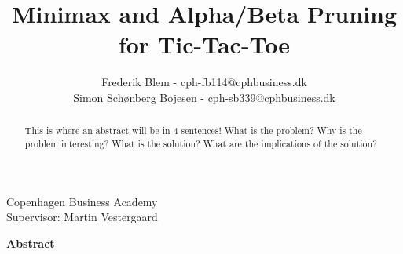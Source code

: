 \documentclass[
english, %
headsepline, %
]{scrartcl} %
\begin{document}
\begin{titlepage}
\title{Minimax and Alpha/Beta Pruning for Tic-Tac-Toe}
\author{Frederik Blem - cph-fb114@cphbusiness.dk\\
Simon Schønberg Bojesen - cph-sb339@cphbusiness.dk}
\subtitle{}
\maketitle
\begin{center}
    \large
        Copenhagen Business Academy\\
        Supervisor: Martin Vestergaard\\
    \normalsize
\end{center}

\thispagestyle{empty}

\end{titlepage}

\large
    \textbf{Abstract}
    \begin{abstract}
        \label{sec:abstract}
        This is where an abstract will be in 4 sentences! What is the problem? Why is the problem interesting? What is the solution? 
        What are the implications of the solution?
    \end{abstract}
\normalsize  

\tableofcontents %


\clearpage








\end{document}

